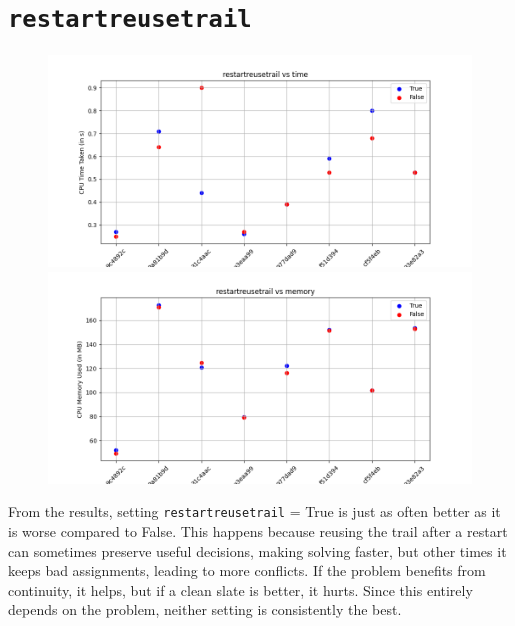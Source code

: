 \documentclass{article}
\begin{document}
    \section*{\texttt{restartreusetrail}}
    \begin{figure}[H]
        \centering
        \begin{minipage}{\textwidth}
            \centering
            \includegraphics[width = \linewidth]{restartreusetrail-0.png}
        \end{minipage}
        \hfill
        \begin{minipage}{\textwidth}
            \centering
            \includegraphics[width = \linewidth]{restartreusetrail-1.png}
        \end{minipage}
    \end{figure}
    From the results, setting \texttt{restartreusetrail} = True is just as
    often better as it is worse compared to False. This happens because reusing
    the trail after a restart can sometimes preserve useful decisions, making
    solving faster, but other times it keeps bad assignments, leading to more
    conflicts. If the problem benefits from continuity, it helps, but if a
    clean slate is better, it hurts. Since this entirely depends on the
    problem, neither setting is consistently the best.
\end{document}
